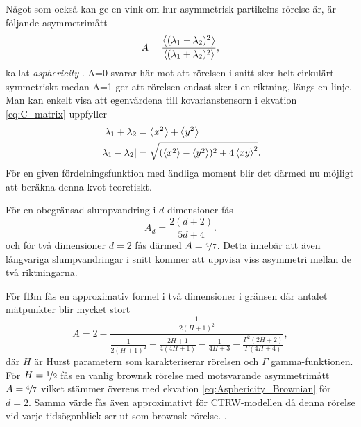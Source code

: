 Något som också kan ge en vink om hur asymmetrisk partikelns rörelse är, är följande asymmetrimått \cite{Hong_asymmetri1998}
\begin{equation}
A=\dfrac{\ev{(\lambda_1 - \lambda_2)^2}}{\ev{(\lambda_1 + \lambda_2)^2}},
\end{equation}
kallat  \emph{asphericity} \cite{Rudnick_Asphericity1986}. A=0 svarar här mot att rörelsen i snitt sker helt cirkulärt symmetriskt medan A=1 ger att rörelsen endast sker i en riktning, längs en linje. Man kan enkelt visa att egenvärdena till kovarianstensorn i ekvation \eqref{eq:C_matrix} uppfyller
\begin{align}
    \lambda_1+\lambda_2 &= \ev{x^2}+\ev{y^2} \\
    \abs{\lambda_1-\lambda_2} &= \sqrt{(\ev{x^2}-\ev{y^2})^2 + 4\ev{xy}^2}.
\end{align} %
För en given fördelningsfunktion med ändliga moment blir det därmed nu möjligt att beräkna denna kvot teoretiskt.

För en obegränsad slumpvandring i $d$ dimensioner fås 
\begin{equation} \label{eq:Asphericity_Brownian}
    A_d=\frac{2(d+2)}{5d+4}.
\end{equation}
och för två dimensioner $d=2$ fås därmed $A=\nicefrac{4}{7}$. Detta innebär att även långvariga slumpvandringar i snitt kommer att uppvisa viss asymmetri mellan de två riktningarna. 

För fBm fås en approximativ formel i två dimensioner i gränsen där antalet mätpunkter blir mycket stort ~\cite{Hong_asymmetri1998}
\begin{equation} \label{eq:A_fBm}
A=2-\frac{\frac{1}{2(H+1)^2}}{\frac{1}{2(H+1)^2}+\frac{2H+1}{4(4H+1)}-\frac{1}{4H+3}-\frac{\Gamma^2(2H+2)}{\Gamma(4H+4)}},
\end{equation}
där $H$ är Hurst parametern som karakteriserar rörelsen och $\Gamma$ gamma-funktionen. För $H=\nicefrac{1}{2}$ fås en vanlig brownsk rörelse med motsvarande  asymmetrimått $A=\nicefrac{4}{7}$ vilket stämmer överens med ekvation \eqref{eq:Asphericity_Brownian} för $d=2$. Samma värde fås även approximativt för CTRW-modellen \cite{Ernst_ACTRW2012} då denna rörelse vid varje tidsögonblick ser ut som brownsk rörelse. .


